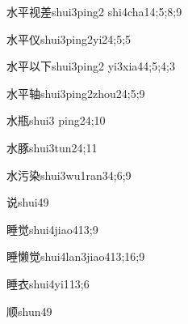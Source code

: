 \begin{verbete}{水平视差}{shui3ping2 shi4cha1}{4;5;8;9}
\end{verbete}

\begin{verbete}{水平仪}{shui3ping2yi2}{4;5;5}
\end{verbete}

\begin{verbete}{水平以下}{shui3ping2 yi3xia4}{4;5;4;3}
\end{verbete}

\begin{verbete}{水平轴}{shui3ping2zhou2}{4;5;9}
\end{verbete}

\begin{verbete}{水瓶}{shui3 ping2}{4;10}
\end{verbete}

\begin{verbete}{水豚}{shui3tun2}{4;11}
\end{verbete}

\begin{verbete}{水污染}{shui3wu1ran3}{4;6;9}
\end{verbete}

\begin{verbete}{说}{shui4}{9}
\end{verbete}

\begin{verbete}{睡觉}{shui4jiao4}{13;9}
\end{verbete}

\begin{verbete}{睡懒觉}{shui4lan3jiao4}{13;16;9}
\end{verbete}

\begin{verbete}{睡衣}{shui4yi1}{13;6}
\end{verbete}

\begin{verbete}{顺}{shun4}{9}
\end{verbete}

